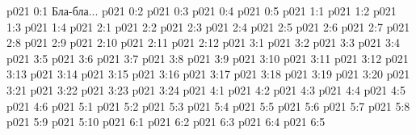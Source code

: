 \author{Совершенствователь Мудрости}
\vs p021 0:1  Бла-бла...
\vs p021 0:2 
\vs p021 0:3 
\vs p021 0:4 \pc 
\vs p021 0:5 
\vs p021 1:1 
\vs p021 1:2 
\vs p021 1:3 
\vs p021 1:4 
\vs p021 2:1 
\vs p021 2:2 \pc 
\vs p021 2:3 
\vs p021 2:4 
\vs p021 2:5 
\vs p021 2:6 
\vs p021 2:7 \pc 
\vs p021 2:8 \pc 
\vs p021 2:9 \pc 
\vs p021 2:10 
\vs p021 2:11 \pc 
\vs p021 2:12 
\vs p021 3:1 
\vs p021 3:2 \pc 
\vs p021 3:3 
\vs p021 3:4 \pc 
\vs p021 3:5 
\vs p021 3:6 
\vs p021 3:7 
\vs p021 3:8 
\vs p021 3:9 
\vs p021 3:10 
\vs p021 3:11 
\vs p021 3:12 \pc 
\vs p021 3:13 
\vs p021 3:14 
\vs p021 3:15 
\vs p021 3:16 \pc 
\vs p021 3:17 
\vs p021 3:18 
\vs p021 3:19 
\vs p021 3:20 
\vs p021 3:21 
\vs p021 3:22 
\vs p021 3:23 
\vs p021 3:24 \pc 
{}
\vs p021 4:1 
\vs p021 4:2 
\vs p021 4:3 
\vs p021 4:4 
\vs p021 4:5 \pc 
\vs p021 4:6 \pc 
{}
\vs p021 5:1 
\vs p021 5:2 
\vs p021 5:3 
\vs p021 5:4 
\vs p021 5:5 \pc 
\vs p021 5:6 \pc 
\vs p021 5:7 
\vs p021 5:8 \pc 
\vs p021 5:9 
\vs p021 5:10 
\vs p021 6:1 
\vs p021 6:2 
\vs p021 6:3 
\vs p021 6:4 
\vsetoff
\vs p021 6:5 
\quizlink
